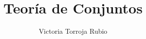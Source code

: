\documentclass{report}
\begin{document}
\title{Teoría de Conjuntos}
\author{Victoria Torroja Rubio}
\date{}

\maketitle

\tableofcontents

\pagebreak

\end{document}
